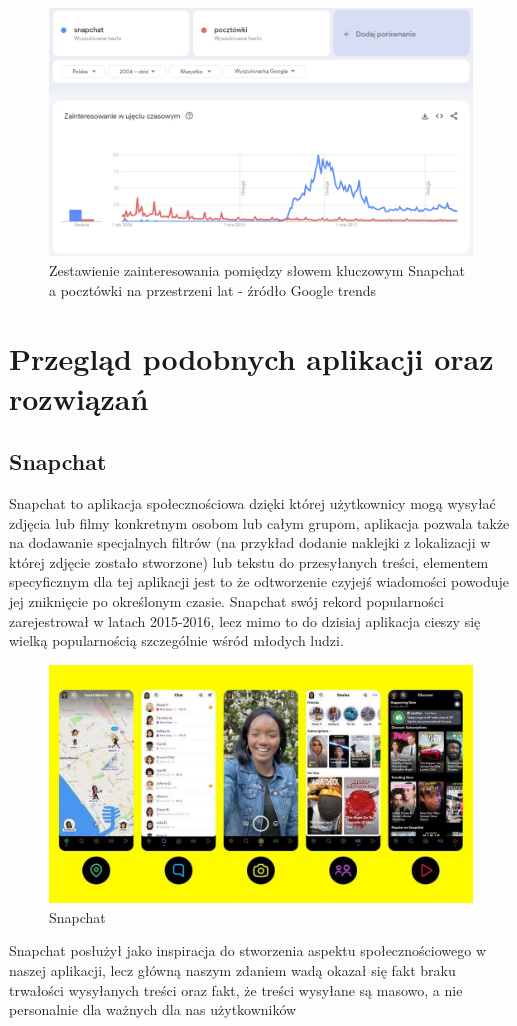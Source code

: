 \documentclass[a4paper,twoside,12pt]{book}
\begin{document}
\begin{figure}[H]
    \centering
    \includegraphics[width=1\textwidth]{porownanie.png}
    \caption{Zestawienie zainteresowania pomiędzy słowem kluczowym Snapchat a pocztówki na przestrzeni lat - źródło Google trends}
\end{figure}

\newpage
\section{Przegląd podobnych aplikacji oraz rozwiązań}
\subsection{Snapchat}
Snapchat to aplikacja społecznościowa dzięki której użytkownicy mogą wysyłać zdjęcia lub filmy konkretnym osobom lub całym grupom, aplikacja pozwala także na dodawanie specjalnych filtrów (na przykład dodanie naklejki z lokalizacji w której zdjęcie zostało stworzone) lub tekstu do przesyłanych treści, elementem specyficznym dla tej aplikacji jest to że odtworzenie czyjejś wiadomości powoduje jej zniknięcie po określonym czasie.
Snapchat swój rekord popularności zarejestrował w latach 2015-2016, lecz mimo to do dzisiaj aplikacja cieszy się wielką popularnością szczególnie wśród młodych ludzi.
\begin{figure}[H]
    \centering
    \includegraphics[width=1\textwidth]{apki_ss/snapchat.jpg}
    \caption{Snapchat}
\end{figure}
Snapchat posłużył jako inspiracja do stworzenia aspektu społecznościowego w naszej aplikacji, lecz główną naszym zdaniem wadą okazał się fakt braku trwałości wysyłanych treści oraz fakt, że treści wysyłane są masowo, a nie personalnie dla ważnych dla nas użytkowników
\end{document}
